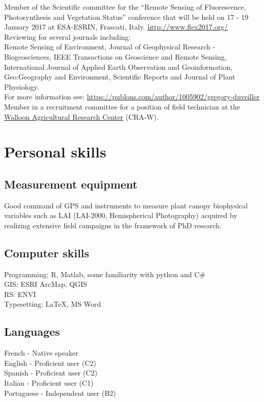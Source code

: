 \documentclass[11pt, a4paper]{article} %
\begin{document}
Member of the Scientific committee for the ``Remote Sensing of Fluorescence, Photosynthesis and Vegetation Status'' conference that will be held on 17 - 19 January 2017 at ESA-ESRIN, Frascati, Italy. \href{http://www.flex2017.org/}{http://www.flex2017.org/}\\

Reviewing for several journals including: \\
Remote Sensing of Environment, Journal of Geophysical Research - Biogeosciences, IEEE Transactions on Geoscience and Remote Sensing, International Journal of Applied Earth Observation and Geoinformation, Geo:Geography and Environment, Scientific Reports and Journal of Plant Physiology.\\
For more information see: \href{https://publons.com/author/1005902/gregory-duveiller#stats}{https://publons.com/author/1005902/gregory-duveiller}\\

Member in a recruitment committee for a position of field technician at the \href{http://www.cra.wallonie.be/en}{Walloon Agricultural Research Center} (CRA-W).


\section*{Personal skills}

\subsection*{Measurement equipment}
Good command of GPS and instruments to measure plant canopy biophysical variables such as LAI (LAI-2000, Hemispherical Photography) acquired by realizing extensive field campaigns in the framework of PhD research.

\subsection*{Computer skills}
Programming: R, Matlab, some familiarity with python and C\#\\
GIS: ESRI ArcMap, QGIS\\
RS: ENVI\\
Typesetting: \LaTeX, MS Word

\subsection*{Languages}
French - Native speaker\\
English - Proficient user (C2)\\
Spanish - Proficient user (C2)\\
Italian - Proficient user (C1)\\
Portuguese - Independent user (B2)
\end{document}

